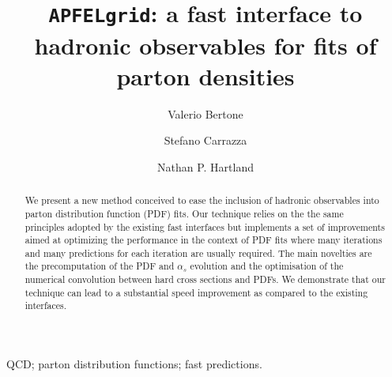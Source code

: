 \documentclass[preprint,12pt]{elsarticle}
\begin{document}
\begin{frontmatter}



\title{{\tt APFELgrid}: a fast interface to hadronic observables for
  fits of parton densities}


\author[a]{Valerio Bertone}
\author[b]{Stefano Carrazza}
\author[a]{Nathan P. Hartland}

\address[a]{Rudolf Peierls Centre for Theoretical Physics,\\ 1 Keble Road, University of Oxford, OX1 3NP, Oxford, UK}
\address[b]{TH Unit, CERN, CH-1211 Geneva 23, Switzerland}

\begin{abstract}
We present a new method conceived to ease the inclusion of hadronic
observables into parton distribution function (PDF) fits. Our
technique relies on the the same principles adopted by the existing
fast interfaces but implements a set of improvements aimed at
optimizing the performance in the context of PDF fits where many
iterations and many predictions for each iteration are usually
required. The main novelties are the precomputation of the PDF and
$\alpha_s$ evolution and the optimisation of the numerical convolution
between hard cross sections and PDFs. We demonstrate that our technique
can lead to a substantial speed improvement as compared to the
existing interfaces.
\end{abstract}

\begin{keyword}
QCD; parton distribution functions; fast predictions.

\end{keyword}

\end{frontmatter}
\end{document}

